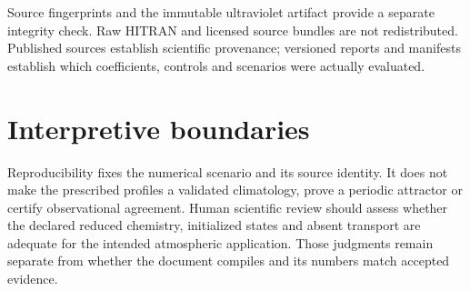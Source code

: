 Source fingerprints and the immutable ultraviolet artifact provide a separate integrity check. Raw HITRAN and licensed source bundles are not redistributed. Published sources establish scientific provenance; versioned reports and manifests establish which coefficients, controls and scenarios were actually evaluated.

\section{Interpretive boundaries}
Reproducibility fixes the numerical scenario and its source identity. It does not make the prescribed profiles a validated climatology, prove a periodic attractor or certify observational agreement. Human scientific review should assess whether the declared reduced chemistry, initialized states and absent transport are adequate for the intended atmospheric application. Those judgments remain separate from whether the document compiles and its numbers match accepted evidence.
